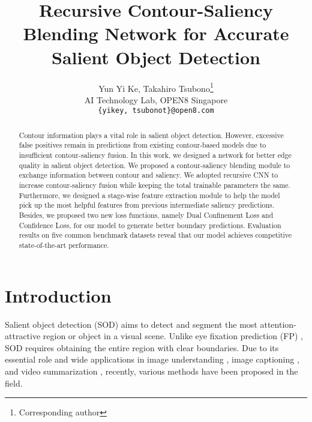\documentclass[10pt,twocolumn,letterpaper]{article}
\begin{document}
\title{Recursive Contour-Saliency Blending Network for Accurate Salient Object Detection}

\author{Yun Yi Ke, Takahiro Tsubono\thanks{Corresponding author}\\
AI Technology Lab, OPEN8 Singapore\\
{\tt\small \{yikey, tsubonot\}@open8.com}
}

\maketitle


\begin{abstract}
Contour information plays a vital role in salient object detection. However, excessive false positives remain in predictions from existing contour-based models due to insufficient contour-saliency fusion. In this work, we designed a network for better edge quality in salient object detection. We proposed a contour-saliency blending module to exchange information between contour and saliency. We adopted recursive CNN to increase contour-saliency fusion while keeping the total trainable parameters the same. Furthermore, we designed a stage-wise feature extraction module to help the model pick up the most helpful features from previous intermediate saliency predictions. Besides, we proposed two new loss functions, namely Dual Confinement Loss and Confidence Loss, for our model to generate better boundary predictions. Evaluation results on five common benchmark datasets reveal that our model achieves competitive state-of-the-art performance. 
\end{abstract}

\section{Introduction}
Salient object detection (SOD) aims to detect and segment the most attention-attractive region or object in a visual scene. Unlike eye fixation prediction (FP) \cite{TREISMAN198097}, SOD requires obtaining the entire region with clear boundaries. Due to its essential role and wide applications in image understanding \cite{IMU}, image captioning \cite{fang2015captions}\cite{xu2016show}, and video summarization \cite{video_summarization}, recently, various methods have been proposed in the field.
\end{document}
